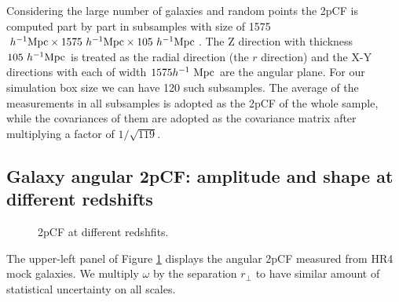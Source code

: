 \documentclass[iop]{emulateapj}
\begin{document}
Considering the large number of galaxies and random points the 2pCF is computed part by part in subsamples with 
size of 1575 $h^{-1}{\rm Mpc}\times 1575\ h^{-1}{\rm Mpc}\times 105\ h^{-1}{\rm Mpc}$.
The Z direction with thickness $105\ h^{-1}\rm Mpc$ is treated as the radial direction (the $r$ direction) 
and the X-Y directions with each of width $1575 h^{-1}\ \rm Mpc$ are the angular plane.
For our simulation box size we can have 120 such subsamples.
The average of the measurements in all subsamples is adopted as the 2pCF of the whole sample,
while the covariances of them are adopted as the covariance matrix after multiplying a factor of $1/\sqrt{119}$.


\subsection{Galaxy angular 2pCF: amplitude and shape at different redshifts}\label{sec_2pCF_diffz}


\begin{figure}
   \caption{\label{fig_diffz}
  2pCF at different redshfits.
   }
\end{figure}

The upper-left panel of Figure \ref{fig_diffz} displays the angular 2pCF measured from HR4 mock galaxies. %
We multiply $\omega$ by the separation $r_\perp$ to have similar amount of statistical uncertainty on all scales.
\end{document}

